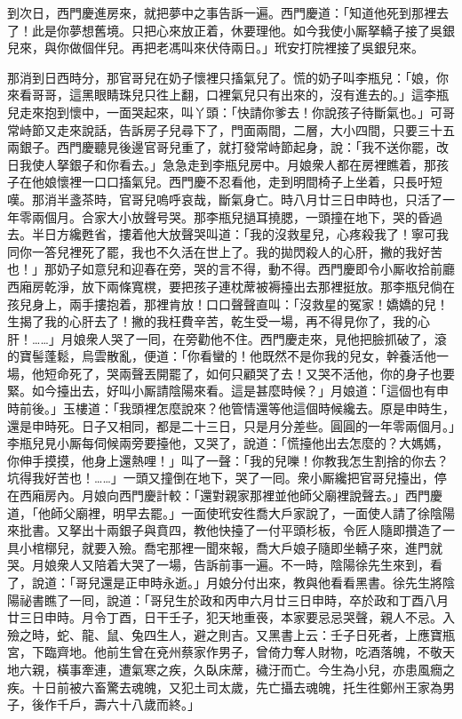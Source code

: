 到次日，西門慶進房來，就把夢中之事告訴一遍。西門慶道：「知道他死到那裡去了！此是你夢想舊境。只把心來放正着，休要理他。如今我使小厮拏轎子接了吳銀兒來，與你做個伴兒。再把老馮叫來伏侍兩日。」玳安打院裡接了吳銀兒來。

那消到日西時分，那官哥兒在奶子懷裡只搐氣兒了。慌的奶子叫李瓶兒：「娘，你來看哥哥，這黑眼睛珠兒只徃上翻，口裡氣兒只有出來的，沒有進去的。」這李瓶兒走來抱到懷中，一面哭起來，叫丫頭：「快請你爹去！你說孩子待斷氣也。」可哥常峙節又走來說話，{}告訴房子兒尋下了，門面兩間，二層，大小四間，只要三十五兩銀子。西門慶聽見後邊官哥兒重了，就打發常峙節起身，說：「我不送你罷，改日我使人拏銀子和你看去。」急急走到李瓶兒房中。月娘衆人都在房裡瞧着，那孩子在他娘懷裡一口口搐氣兒。{}西門慶不忍看他，走到明間椅子上坐着，只長吁短嘆。那消半盞茶時，官哥兒嗚呼哀哉，斷氣身亡。時八月廿三日申時也，只活了一年零兩個月。合家大小放聲号哭。那李瓶兒撾耳撓腮，一頭撞在地下，哭的昏過去。半日方纔甦省，摟着他大放聲哭叫道：「我的沒救星兒，心疼殺我了！寧可我同你一答兒裡死了罷，我也不久活在世上了。我的拋閃殺人的心肝，撇的我好苦也！」那奶子如意兒和迎春在旁，哭的言不得，動不得。西門慶即令小厮收拾前廳西廂房乾淨，放下兩條寬櫈，要把孩子連枕蓆被褥擡出去那裡挺放。那李瓶兒倘在孩兒身上，兩手摟抱着，那裡肯放！口口聲聲直叫：「沒救星的冤家！嬌嬌的兒！生揭了我的心肝去了！撇的我枉費辛苦，乾生受一場，再不得見你了，我的心肝！……」月娘衆人哭了一囘，在旁勸他不住。西門慶走來，見他把臉抓破了，滾的寶髻蓬鬆，烏雲散亂，便道：「你看蠻的！他既然不是你我的兒女，幹養活他一場，他短命死了，哭兩聲丟開罷了，{}如何只顧哭了去！又哭不活他，你的身子也要緊。如今擡出去，好叫小厮請陰陽來看。這是甚麼時候？」月娘道：「這個也有申時前後。」玉樓道：「我頭裡怎麼說來？他管情還等他這個時候纔去。原是申時生，還是申時死。日子又相同，都是二十三日，只是月分差些。圓圓的一年零兩個月。」李瓶兒見小厮每伺候兩旁要擡他，又哭了，說道：「慌擡他出去怎麼的？大媽媽，你伸手摸摸，他身上還熱哩！」{}叫了一聲：「我的兒嚛！你教我怎生割捨的你去？坑得我好苦也！……」一頭又撞倒在地下，哭了一囘。衆小厮纔把官哥兒擡出，停在西廂房內。月娘向西門慶計較：「還對親家那裡並他師父廟裡說聲去。」西門慶道，「他師父廟裡，明早去罷。」一面使玳安徃喬大戶家說了，一面使人請了徐陰陽來批書。又拏出十兩銀子與賁四，教他快擡了一付平頭杉板，令匠人隨即攢造了一具小棺槨兒，就要入殮。喬宅那裡一聞來報，喬大戶娘子隨即坐轎子來，進門就哭。月娘衆人又陪着大哭了一場，告訴前事一遍。不一時，陰陽徐先生來到，看了，說道：「哥兒還是正申時永逝。」月娘分付出來，教與他看看黑書。徐先生將陰陽祕書瞧了一囘，說道：「哥兒生於政和丙申六月廿三日申時，卒於政和丁酉八月廿三日申時。月令丁酉，日干壬子，犯天地重䘮，本家要忌忌哭聲，親人不忌。入殮之時，蛇、龍、鼠、兔四生人，避之則吉。又黑書上云：壬子日死者，上應寶瓶宮，下臨齊地。他前生曾在兗州蔡家作男子，曾倚力奪人財物，吃酒落魄，不敬天地六親，橫事牽連，遭氣寒之疾，久臥床蓆，穢汙而亡。今生為小兒，亦患風癇之疾。十日前被六畜驚去魂魄，又犯土司太歲，先亡攝去魂魄，托生徃鄭州王家為男子，後作千戶，壽六十八歲而終。」

